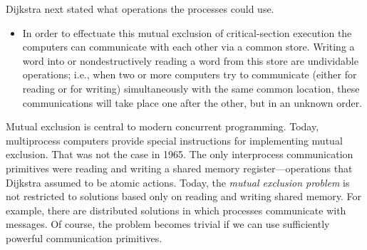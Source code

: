 \documentclass[fleqn,leqno]{article}
\begin{document}
Dijkstra next stated what operations the processes could use.
\begin{itemize}
\item[] In order to effectuate this mutual
exclusion of critical-section execution the computers can
communicate with each other via a common 
store. Writing
a word into or nondestructively reading a word from this
store are undividable operations; i.e., when two or more
computers try to communicate (either for reading or for
writing) simultaneously with the same common location,
these communications will take place one after the other,
but in an unknown order.
\end{itemize}
%
Mutual exclusion is central to modern concurrent programming.  
% 
% 
Today, multiprocess computers provide special instructions for
implementing mutual exclusion.  That was not the case in 1965.  The
only interprocess communication primitives were reading and writing a
shared memory register---operations that Dijkstra assumed to be atomic
actions.  Today, the \emph{mutual exclusion problem} is not restricted
to solutions based only on reading and writing shared memory.  For
example, there are distributed solutions in which processes
communicate with messages.  Of course, the problem becomes trivial if
we can use sufficiently powerful communication primitives.
\end{document}
